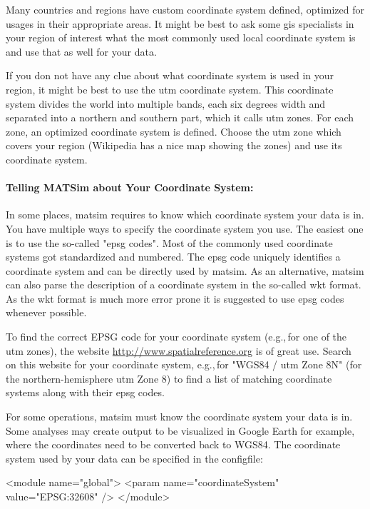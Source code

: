 Many countries and regions have custom coordinate system defined, optimized for usages in their appropriate areas. It might be best to ask some \gls{gis} specialists in your region of interest what the most commonly used local coordinate system is and use that as well for your data.

If you don not have any clue about what coordinate system is used in your region, it might be best to use the \gls{utm} coordinate system. This coordinate system divides the world into multiple bands, each six degrees width and separated into a northern and southern part, which it calls \gls{utm} zones. For each zone, an optimized coordinate system is defined. Choose the \gls{utm} zone which covers your region (Wikipedia has a nice map showing the zones) and use its coordinate system. 

\paragraph{Telling MATSim about Your Coordinate System:}
In some places, \gls{matsim} requires to know which coordinate system your data is in. You have multiple ways to specify the coordinate system you use. The easiest one is to use the so-called "\gls{epsg} codes". Most of the commonly used coordinate systems got standardized and numbered. The \gls{epsg} code uniquely identifies a coordinate system and can be directly used by \gls{matsim}. As an alternative, \gls{matsim} can also parse the description of a coordinate system in the so-called \gls{wkt} format. As the \gls{wkt} format is much more error prone it is suggested to use \gls{epsg} codes whenever possible.

To find the correct EPSG code for your coordinate system (e.g.,\,for one of the \gls{utm} zones), the website \url{http://www.spatialreference.org} is of great use. Search on this website for your coordinate system, e.g.,\,for "WGS84 / \gls{utm} Zone 8N" (for the northern-hemisphere \gls{utm} Zone 8) to find a list of matching coordinate systems along with their \gls{epsg} codes.

For some operations, \gls{matsim} must know the coordinate system your data is in. Some analyses may create output to be visualized in Google Earth for example, where the coordinates need to be converted back to WGS84. The coordinate system used by your data can be specified in the \gls{configfile}:

\begin{xml}
<module name="global"> 
  <param name="coordinateSystem" value="EPSG:32608" /> 
</module>
\end{xml}

